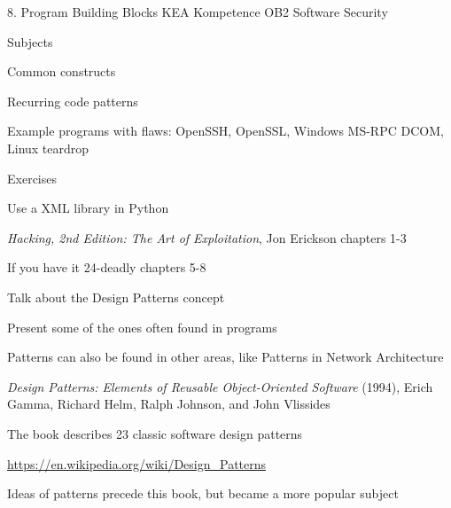 \documentclass[Screen16to9,17pt]{foils}
\begin{document}
\mytitlepage
{8. Program Building Blocks}
{KEA Kompetence OB2 Software Security}


\begin{list1}
\item Subjects
\begin{list2}
\item Common constructs
\item Recurring code patterns
\item Example programs with flaws: OpenSSH, OpenSSL, Windows MS-RPC DCOM, Linux teardrop
\end{list2}
\item Exercises
\begin{list2}
\item Use a XML library in Python
\end{list2}
\end{list1}


\begin{list1}
\item \emph{Hacking, 2nd Edition: The Art of Exploitation}, Jon Erickson chapters 1-3
\item If you have it 24-deadly chapters 5-8
\end{list1}



\begin{list1}
\item Talk about the Design Patterns concept
\item Present some of the ones often found in programs
\item Patterns can also be found in other areas, like Patterns in Network Architecture
\end{list1}


\begin{list2}
\item \emph{Design Patterns: Elements of Reusable Object-Oriented Software} (1994), Erich Gamma, Richard Helm, Ralph Johnson, and John Vlissides

\item The book describes 23 classic software design patterns

\item \url{https://en.wikipedia.org/wiki/Design_Patterns}

\item Ideas of patterns precede this book, but became a more popular subject
\end{list2}
\end{document}
